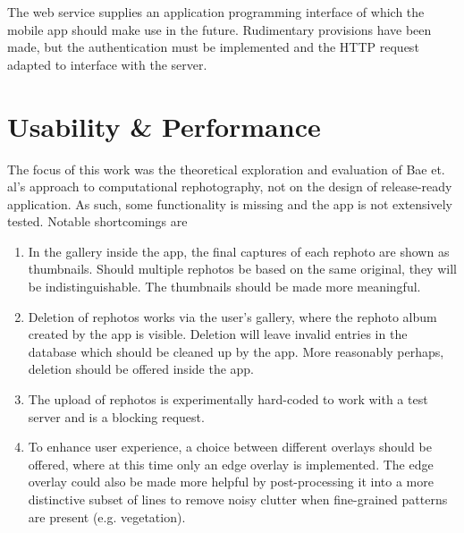 The web service supplies an application programming interface of which the mobile
app should make use in the future. Rudimentary provisions have been made, but
the authentication must be implemented and the HTTP request adapted to interface
with the server.

\section{Usability \& Performance}

The focus of this work was the theoretical exploration and evaluation of Bae et.
al's approach to computational rephotography, not on the design of release-ready
application. As such, some functionality is missing and the app is not
extensively tested. Notable shortcomings are
\begin{enumerate}
   \item In the gallery inside the app, the final captures of each rephoto are
      shown as thumbnails. Should multiple rephotos be based on the same
      original, they will be indistinguishable. The thumbnails should be made
      more meaningful.

   \item Deletion of rephotos works via the user's gallery, where the rephoto
      album created by the app is visible. Deletion will leave invalid entries
      in the database which should be cleaned up by the app. More reasonably
      perhaps, deletion should be offered inside the app.


   \item The upload of rephotos is experimentally hard-coded to work with a test
      server and is a blocking request.

   \item To enhance user experience, a choice between different overlays should
      be offered, where at this time only an edge overlay is implemented. The
      edge overlay could also be made more helpful by post-processing it into a
      more distinctive subset of lines to remove noisy clutter when fine-grained
      patterns are present (e.g. vegetation).


\end{enumerate}
